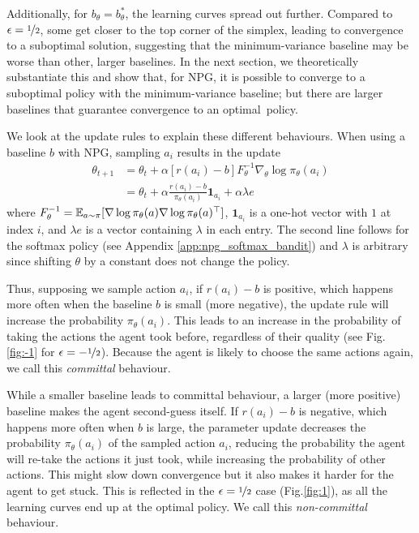 Additionally, for $b_\theta=b^*_\theta$, the learning curves spread out further. Compared to $\epsilon=\nicefrac{1}{2}$, some get closer to the top corner of the simplex, leading to convergence to a suboptimal solution, suggesting that the minimum-variance baseline may be worse than other, larger baselines. In the next section, we theoretically substantiate this and show that, for NPG, it is possible to converge to a suboptimal policy with the minimum-variance baseline; but there are larger baselines that guarantee convergence to an optimal~policy.

We look at the update rules to explain these different behaviours. When using a baseline $b$ with NPG, sampling $a_i$ results in the update
\begin{align*}
    \theta_{t+1} &= \theta_t + \alpha  [r(a_i)-b] F_\theta^{-1} \nabla_\theta \log \pi_\theta(a_i) \label{eq:npg_bandit_update} \\
    &= \theta_t + \alpha \frac{r(a_i)-b}{\pi_\theta(a_i)} \mathbf{1}_{a_i} + \alpha\lambda e
\end{align*}
where $F_\theta^{-1} = \mathbb{E}_{a \sim \pi} [\nabla \log \pi_\theta (a) \nabla \log \pi_\theta (a)^\top]$, $\mathbf{1}_{a_i}$ is a one-hot vector with $1$ at index $i$, and $\lambda e$ is a vector containing $\lambda$ in each entry.  The second line follows for the softmax policy (see Appendix \ref{app:npg_softmax_bandit}) and $\lambda$ is arbitrary since shifting $\theta$ by a constant does not change the policy.


Thus, supposing we sample action $a_i$, if $r(a_i) - b$ is positive, which happens more often when the baseline $b$ is small (more negative), the update rule will increase the probability $\pi_\theta(a_i)$. This leads to an increase in the probability of taking the actions the agent took before, regardless of their quality (see Fig.\ref{fig:-1} for $\epsilon=-\nicefrac{1}{2}$). Because the agent is likely to choose the same actions again, we call this \textit{committal} behaviour.

While a smaller baseline leads to committal behaviour, a larger (more positive) baseline makes the agent second-guess itself. If $r(a_i) - b$ is negative, which happens more often when $b$ is large, the parameter update decreases the probability $\pi_\theta(a_i)$ of the sampled action $a_i$, reducing the probability the agent will re-take the actions it just took, while increasing the probability of other actions. This might slow down convergence but it also makes it harder for the agent to get stuck. This is reflected in the $\epsilon = \nicefrac{1}{2}$ case (Fig.\ref{fig:1}), as all the learning curves end up at the optimal policy. We call this \textit{non-committal} behaviour.

